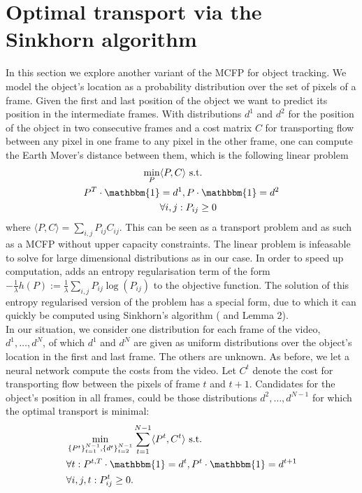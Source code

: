 \documentclass{article}
\begin{document}
\section{Optimal transport via the Sinkhorn algorithm}
In this section we explore another variant of the MCFP for object tracking. We model the object's location as a probability distribution over the set of pixels of a frame. Given the first and last position of the object we want to predict its position in the intermediate frames. With distributions $d^1$ and $d^2$ for the position of the object in two consecutive frames and a cost matrix $C$ for transporting flow between any pixel in one frame to any pixel in the other frame, one can compute the Earth Mover's distance between them, which is the following linear problem
\begin{align}\label{EMD}
\min_{P} &\langle P, C \rangle \textnormal{ s.t. } \\
 P^T \cdot \mathbbm{1} &= d^1,  P\cdot \mathbbm{1} = d^2 \nonumber\\
&\forall i, j: P_{ij} \geq 0 \nonumber
\end{align}
where $\langle P, C \rangle = \sum_{i,j} P_{ij}C_{ij}$. This can be seen as a transport problem and as such as a MCFP without upper capacity constraints. The linear problem is infeasable to solve for large dimensional distributions as in our case. In order to speed up computation, \cite{Cut13} adds an entropy regularisation term of the form $-\frac{1}{\lambda}h(P) := \frac{1}{\lambda}\sum_{i,j} P_{ij}\log(P_{ij})$ to the objective function. The solution of this entropy regularised version of the problem has a special form, due to which it can quickly be computed using Sinkhorn's algorithm (\cite{Sink67} and \cite{Cut13} Lemma 2). \\
In our situation, we consider one distribution for each frame of the video, $d^1, \dots, d^N$, of which $d^1$ and $d^N$ are given as uniform distributions over the object's location in the first and last frame. The others are unknown. As before, we let a neural network compute the costs from the video. Let $C^t$ denote the cost for transporting flow between the pixels of frame $t$ and $t+1$. Candidates for the object's position in all frames, could be those distributions $d^2, \dots, d^{N-1}$ for which the optimal transport is minimal:
\begin{align}\label{EMDtrack}
&\min_{\{P^t\}_{t=1}^{N-1}, \{d^t\}_{t=2}^{N-1}} \sum_{t=1}^{N-1} \langle P^t, C^t\rangle \textnormal{ s.t. }\\
&\forall t: P^{t,T} \cdot \mathbbm{1} = d^t, P^t\cdot \mathbbm{1} = d^{t+1} \nonumber\\
&\forall i,j,t: P^t_{ij} \geq 0.\nonumber
\end{align}
\end{document}
